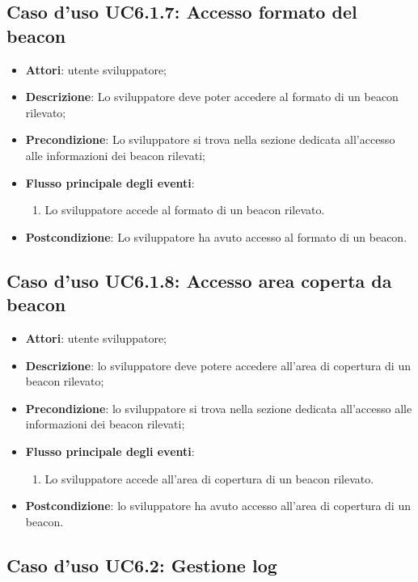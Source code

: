 \documentclass[../AnalisiDeiRequisiti.tex]{subfiles}
\begin{document}
\subsection{Caso d'uso UC6.1.7: Accesso formato del beacon}
\begin{itemize}
	\item \textbf{Attori}: utente sviluppatore;
	\item \textbf{Descrizione}: Lo sviluppatore deve poter accedere al formato di un beacon rilevato; 
	\item \textbf{Precondizione}: Lo sviluppatore si trova nella sezione dedicata all'accesso alle informazioni dei beacon rilevati;
	
	\item \textbf{Flusso principale degli eventi}:
	\begin{enumerate}
		\item Lo sviluppatore accede al formato di un beacon rilevato.
		
	\end{enumerate}
	\item \textbf{Postcondizione}: Lo sviluppatore ha avuto accesso al formato di un beacon.
\end{itemize}
\hypertarget{UC6.1.8}{}
\subsection{Caso d'uso UC6.1.8: Accesso area coperta da beacon}
\begin{itemize}
	\item \textbf{Attori}: utente sviluppatore;
	\item \textbf{Descrizione}: lo sviluppatore deve potere accedere all'area di copertura di un beacon rilevato; 
	\item \textbf{Precondizione}: lo sviluppatore si trova nella sezione dedicata all'accesso alle informazioni dei beacon rilevati;
	
	\item \textbf{Flusso principale degli eventi}:
	\begin{enumerate}
		\item Lo sviluppatore accede all’area di copertura di un beacon rilevato.
		
	\end{enumerate}
	\item \textbf{Postcondizione}: lo sviluppatore ha avuto accesso all’area di copertura di un beacon.
\end{itemize}
\hypertarget{UC6.2}{}
\subsection{Caso d'uso UC6.2: Gestione log}
\end{document}
